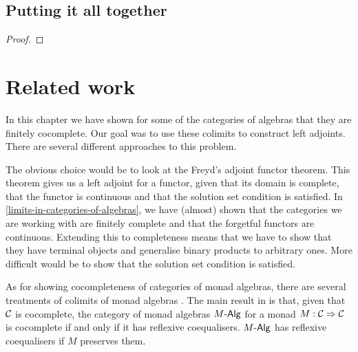 \subsection{Putting it all together}

\begin{theorem}
  \label{initial-objects-qits}

\end{theorem}

\begin{proof}
\end{proof}

\section{Related work}

In this chapter we have shown for some of the categories of algebras
that they are finitely cocomplete. Our goal was to use these colimits
to construct left adjoints. There are several different approaches to
this problem.

The obvious choice would be to look at the Freyd's adjoint functor
theorem. This theorem gives us a left adjoint for a functor, given
that its domain is complete, that the functor is continuous and that
the solution set condition is satisfied. In
\cref{limits-in-categories-of-algebras}, we have (almost) shown that
the categories we are working with are finitely complete and that the
forgetful functors are continuous. Extending this to completeness
means that we have to show that they have terminal objects and
generalise binary products to arbitrary ones. More difficult would be
to show that the solution set condition is satisfied.

As for showing cocompleteness of categories of monad algebras, there
are several treatments of colimits of monad algebras
\cite{Linton1969,Barr1985}. The main result in \cite{Linton1969} is
that, given that $\mathcal{C}$ is cocomplete, the category of monad algebras
$\monalgcat{M}$ for a monad $M : \mathcal{C} \Rightarrow \mathcal{C}$ is cocomplete if and
only if it has reflexive coequalisers. $\monalgcat{M}$ has reflexive
coequalisers if $M$ preserves them.
